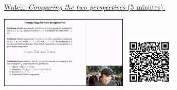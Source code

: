
\begin{minipage}{10cm}
    \href{https://act4e-spring21.netlify.app/videos/spring2021-monads-b:comparing-perspectives.html}{Watch: \emph{Comparing the two perspectives} (5 minutes).}
        
    \href{https://act4e-spring21.netlify.app/videos/spring2021-monads-b:comparing-perspectives.html}{\includegraphics[height=3.5cm]{spring2021-monads-b:comparing-perspectives/thumbnails.jpg}}
    \href{https://act4e-spring21.netlify.app/videos/spring2021-monads-b:comparing-perspectives.html}{\includegraphics[height=2.5cm]{spring2021-monads-b:comparing-perspectives/qrcode.png}}
\end{minipage}
